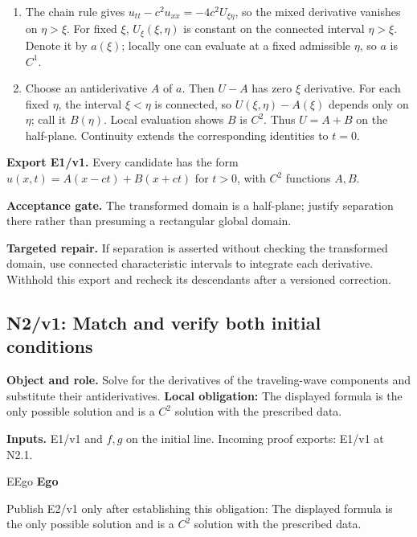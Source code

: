 \documentclass[preprint,12pt,aps,pra,showkeys,amsmath,amssymb,superscriptaddress,floatfix]{revtex4-2}
\theoremstyle{definition}
\theoremstyle{remark}
\newcommand{\mmfaculty}[3]{%
 \begin{mmfacultybox}{#1}{#2}
 {\sffamily\bfseries\color{MMBlue}#2}\par\smallskip #3
 \end{mmfacultybox}}
\newcommand{\field}[2]{\par\smallskip\noindent\textbf{#1.} #2\par}
\begin{document}
\begin{enumerate}[label=N1.\arabic*,leftmargin=3.4em]

\item The chain rule gives \(u_{tt}-c^2u_{xx}=-4c^2U_{\xi\eta}\), so the mixed
derivative vanishes on \(\eta>\xi\). For fixed \(\xi\),
\(U_\xi(\xi,\eta)\) is constant on the connected interval \(\eta>\xi\).
Denote it by \(a(\xi)\); locally one can evaluate at a fixed admissible
\(\eta\), so \(a\) is \(C^1\).

\item Choose an antiderivative \(A\) of \(a\). Then \(U-A\) has zero \(\xi\)
derivative. For each fixed \(\eta\), the interval \(\xi<\eta\) is
connected, so \(U(\xi,\eta)-A(\xi)\) depends only on \(\eta\); call it
\(B(\eta)\). Local evaluation shows \(B\) is \(C^2\). Thus \(U=A+B\) on
the half-plane. Continuity extends the corresponding identities to
\(t=0\).

\end{enumerate}

\field{Export E1/v1}{Every candidate has the form \(u(x,t)=A(x-ct)+B(x+ct)\) for \(t>0\),
with \(C^2\) functions \(A,B\).}

\field{Acceptance gate}{The transformed domain is a half-plane; justify separation there rather
than presuming a rectangular global domain.}

\field{Targeted repair}{If separation is asserted without checking the transformed domain, use
connected characteristic intervals to integrate each derivative.
Withhold this export and recheck its descendants after a versioned
correction.}

\clearpage

\subsection{N2/v1: Match and verify both initial conditions}

\field{Object and role}{Solve for the derivatives of the traveling-wave components and
substitute their antiderivatives. \textbf{Local obligation:} The
displayed formula is the only possible solution and is a \(C^2\)
solution with the prescribed data.}

\field{Inputs}{E1/v1 and \(f,g\) on the initial line. Incoming proof exports: E1/v1 at
N2.1.}

\mmfaculty{E}{Ego}{Publish E2/v1 only after establishing this obligation: The displayed
formula is the only possible solution and is a \(C^2\) solution with the
prescribed data.}
\end{document}
